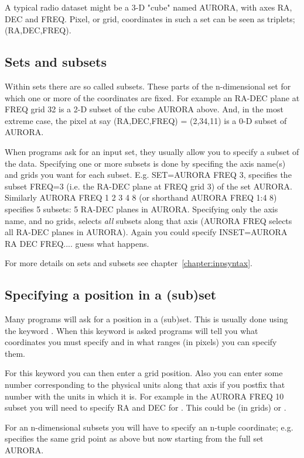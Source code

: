 A typical radio dataset might be a 3-D "cube" named AURORA, with axes
RA, DEC and FREQ.  Pixel, or grid, coordinates in such a set can be seen
as triplets; (RA,DEC,FREQ). 

\subsection{Sets and subsets}

Within sets there are so called subsets.  These parts of the
n-dimensional set for which one or more of the coordinates are fixed. 
For example an RA-DEC plane at FREQ grid 32 is a 2-D subset of the cube
AURORA above.  And, in the most extreme case, the pixel at say (RA,DEC,FREQ)
= (2,34,11) is a 0-D subset of AURORA. 

When programs ask for an input set, they usually allow you to specify a
subset of the data. Specifying one or more subsets is done by specifing
the axis name(s) and grids you want for each subset. E.g. SET=AURORA
FREQ 3, specifies the subset FREQ=3 (i.e. the RA-DEC plane at FREQ grid
3) of the set AURORA. Similarly AURORA FREQ 1 2 3 4 8 (or shorthand
AURORA FREQ 1:4 8) specifies 5 subsets: 5 RA-DEC planes in AURORA.
Specifying only the axis name, and no grids, selects {\em all} subsets
along that axis (AURORA FREQ selects all RA-DEC planes in AURORA). Again
you could specify INSET=AURORA RA DEC FREQ.... guess what happens.

For more details on sets and subsets see chapter~\ref{chapter:inpsyntax}. 

\subsection{Specifying a position in a (sub)set}

Many programs will ask for a position in a (sub)set. This is usually
done using the keyword . When this keyword is asked
programs will tell you what coordinates you must specify and in what
ranges (in pixels) you can specify them. 

For this keyword you can then enter a grid position. Also you can enter
some number corresponding to the physical units along that axis if you
postfix that number with the units in which it is. For example in the
AURORA FREQ 10 subset you will need to specify RA and DEC for
. This could be (in grids) or
.

For an n-dimensional subsets you will have to specify an n-tuple
coordinate; e.g.   specifies the same grid point as
above but now starting from the full set AURORA. 

